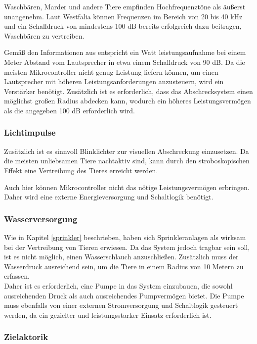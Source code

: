 Waschbären, Marder und andere Tiere empfinden Hochfrequenztöne als äußerst unangenehm. Laut Westfalia \cite{westfalia_wasch} können Frequenzen im Bereich von 20 bis 40 kHz und ein Schalldruck von mindestens 100 dB bereits erfolgreich dazu beitragen, Waschbären zu vertreiben.

Gemäß den Informationen aus \cite{sound_amplifier} entspricht ein Watt leistungsaufnahme bei einem Meter Abstand vom Lautsprecher in etwa einem Schalldruck von 90 dB. Da die meisten Mikrocontroller nicht genug Leistung liefern können, um einen Lautsprecher mit höheren Leistungsanforderungen anzusteuern, wird ein Verstärker benötigt. Zusätzlich ist es erforderlich, dass das Abschrecksystem einen möglichst großen Radius abdecken kann, wodurch ein höheres Leistungsvermögen als die angegeben 100 dB erforderlich wird.

\subsubsection{Lichtimpulse}

Zusätzlich ist es sinnvoll Blinklichter zur visuellen Abschreckung einzusetzen. Da die meisten unliebsamen Tiere nachtaktiv sind, kann durch den stroboskopischen Effekt eine Vertreibung des Tieres erreicht werden. \cite{anti_wasch}

Auch hier können Mikrocontroller nicht das nötige Leistungsvermögen erbringen. Daher wird eine externe Energieversorgung und Schaltlogik benötigt.

\subsubsection{Wasserversorgung}

Wie in Kapitel \ref{sprinkler} beschrieben, haben sich Sprinkleranlagen als wirksam bei der Vertreibung von Tieren erwiesen. Da das System jedoch tragbar sein soll, ist es nicht möglich, einen Wasserschlauch anzuschließen. Zusätzlich muss der Wasserdruck ausreichend sein, um die Tiere in einem Radius von 10 Metern zu erfassen.
\\
Daher ist es erforderlich, eine Pumpe in das System einzubauen, die sowohl ausreichenden Druck als auch ausreichendes Pumpvermögen bietet. Die Pumpe muss ebenfalls von einer externen Stromversorgung und Schaltlogik gesteuert werden, da ein gezielter und leistungsstarker Einsatz erforderlich ist.

\subsubsection{Zielaktorik}

